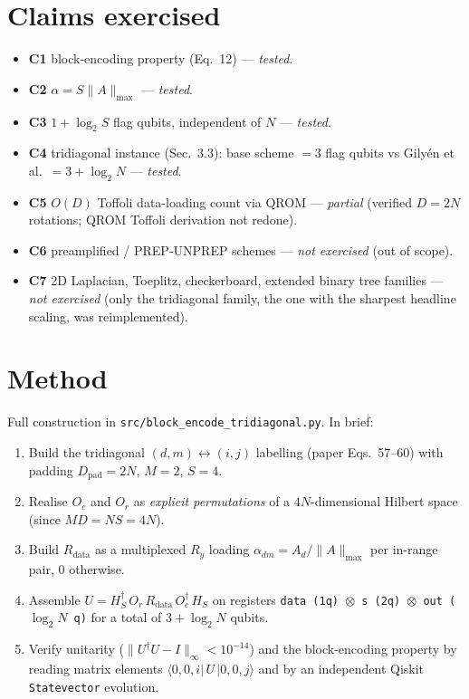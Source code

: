 \documentclass[11pt]{article}
\begin{document}
\section{Claims exercised}
\begin{itemize}
  \item \textbf{C1} block-encoding property (Eq.~12) --- \emph{tested}.
  \item \textbf{C2} $\alpha = S \|A\|_{\max}$ --- \emph{tested}.
  \item \textbf{C3} $1 + \log_2 S$ flag qubits, independent of $N$
        --- \emph{tested}.
  \item \textbf{C4} tridiagonal instance (Sec.~3.3): base scheme
        $= 3$ flag qubits vs Gily\'en et al.\ $= 3 + \log_2 N$
        --- \emph{tested}.
  \item \textbf{C5} $O(D)$ Toffoli data-loading count via QROM ---
        \emph{partial} (verified $D = 2N$ rotations; QROM Toffoli
        derivation not redone).
  \item \textbf{C6} preamplified / PREP-UNPREP schemes ---
        \emph{not exercised} (out of scope).
  \item \textbf{C7} 2D Laplacian, Toeplitz, checkerboard, extended
        binary tree families --- \emph{not exercised} (only the
        tridiagonal family, the one with the sharpest headline
        scaling, was reimplemented).
\end{itemize}

\section{Method}
Full construction in \texttt{src/block\_encode\_tridiagonal.py}. In
brief:
\begin{enumerate}
  \item Build the tridiagonal $(d,m) \leftrightarrow (i,j)$ labelling
        (paper Eqs.~57--60) with padding $D_{\mathrm{pad}} = 2N$,
        $M = 2$, $S = 4$.
  \item Realise $O_c$ and $O_r$ as \emph{explicit permutations} of a
        $4N$-dimensional Hilbert space (since $MD = NS = 4N$).
  \item Build $R_{\mathrm{data}}$ as a multiplexed $R_y$ loading
        $\alpha_{dm} = A_d / \|A\|_{\max}$ per in-range pair, $0$
        otherwise.
  \item Assemble
        $U = H_S^{\dagger} \, O_r \, R_{\mathrm{data}} \, O_c^{\dagger} \, H_S$
        on registers \texttt{data (1q) $\otimes$ s (2q) $\otimes$ out ($\log_2 N$ q)}
        for a total of $3 + \log_2 N$ qubits.
  \item Verify unitarity ($\|U^\dagger U - I\|_\infty < 10^{-14}$) and
        the block-encoding property by reading matrix elements
        $\langle 0,0,i|\,U\,|0,0,j\rangle$ and by an independent
        Qiskit \texttt{Statevector} evolution.
\end{enumerate}
\end{document}
